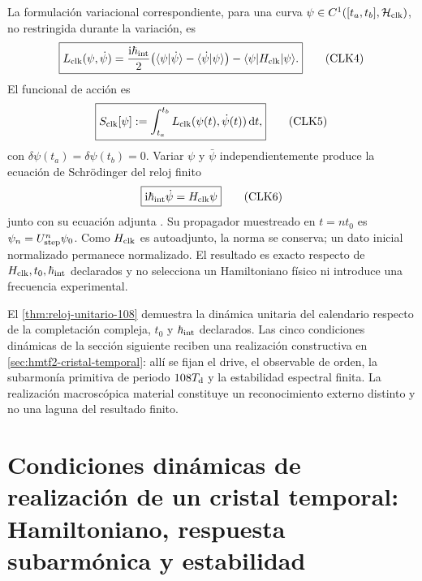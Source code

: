 La formulación variacional correspondiente, para una curva
\(\psi\in C^1([t_a,t_b],\mathcal H_{\rm clk})\), no restringida durante la
variación, es
\[
 \boxed{
 L_{\rm clk}(\psi,\dot\psi)
 =\frac{\mathrm i\hbar_{\rm int}}2
 \bigl(
 \langle\psi|\dot\psi\rangle
 -\langle\dot\psi|\psi\rangle
 \bigr)
 -\langle\psi|H_{\rm clk}|\psi\rangle.}
 \tag{CLK4}\label{eq:lagrangiano-reloj-108}
\]
El funcional de acción es
\[
 \boxed{
 S_{\rm clk}[\psi]
 :=\int_{t_a}^{t_b}
 L_{\rm clk}(\psi(t),\dot\psi(t))\,\mathrm dt,}
 \tag{CLK5}\label{eq:accion-reloj-108}
\]
con \(\delta\psi(t_a)=\delta\psi(t_b)=0\).
Variar \(\psi\) y \(\bar\psi\) independientemente produce la ecuación de
Schrödinger del reloj finito
\[
 \boxed{\mathrm i\hbar_{\rm int}\dot\psi=H_{\rm clk}\psi}
 \tag{CLK6}\label{eq:schrodinger-reloj-108}
\]
junto con su ecuación adjunta \cite{SchrodingerNobel}. Su propagador muestreado
en \(t=nt_0\) es \(\psi_n=U_{\rm step}^{n}\psi_0\). Como \(H_{\rm clk}\) es
autoadjunto, la norma se conserva; un dato inicial normalizado permanece
normalizado. El resultado es exacto respecto de
\(H_{\rm clk},t_0,\hbar_{\rm int}\) declarados y no selecciona un Hamiltoniano
físico ni introduce una frecuencia experimental.

El \cref{thm:reloj-unitario-108} demuestra la dinámica unitaria del calendario
respecto de la completación compleja, \(t_0\) y \(\hbar_{\rm int}\)
declarados. Las cinco condiciones dinámicas de la sección siguiente reciben
una realización constructiva en \cref{sec:hmtf2-cristal-temporal}: allí se
fijan el drive, el observable de orden, la subarmonía primitiva de periodo
\(108T_{\rm d}\) y la estabilidad espectral finita. La realización
macroscópica material constituye un reconocimiento externo distinto y no una
laguna del resultado finito.

\section{Condiciones dinámicas de realización de un cristal temporal: Hamiltoniano, respuesta subarmónica y estabilidad}
\label{sec:programa-cristal-tiempo}

